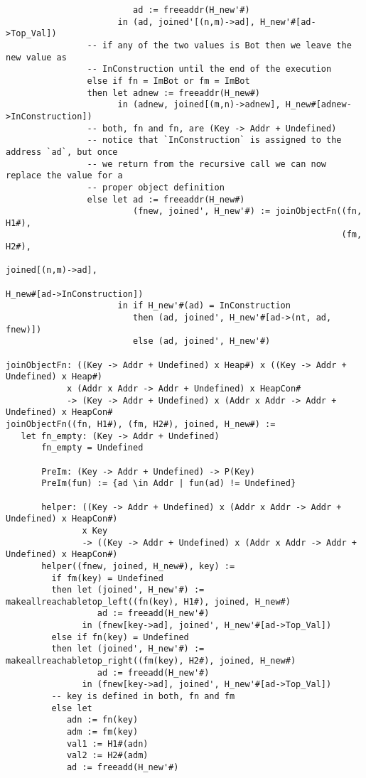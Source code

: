 \begin{verbatim}
                         ad := freeaddr(H_new'#)
                      in (ad, joined'[(n,m)->ad], H_new'#[ad->Top_Val])
                -- if any of the two values is Bot then we leave the new value as
                -- InConstruction until the end of the execution
                else if fn = ImBot or fm = ImBot
                then let adnew := freeaddr(H_new#)
                      in (adnew, joined[(m,n)->adnew], H_new#[adnew->InConstruction])
                -- both, fn and fn, are (Key -> Addr + Undefined)
                -- notice that `InConstruction` is assigned to the address `ad`, but once
                -- we return from the recursive call we can now replace the value for a
                -- proper object definition
                else let ad := freeaddr(H_new#)
                         (fnew, joined', H_new'#) := joinObjectFn((fn, H1#),
                                                                  (fm, H2#),
                                                                  joined[(n,m)->ad],
                                                                  H_new#[ad->InConstruction])
                      in if H_new'#(ad) = InConstruction
                         then (ad, joined', H_new'#[ad->(nt, ad, fnew)])
                         else (ad, joined', H_new'#)

joinObjectFn: ((Key -> Addr + Undefined) x Heap#) x ((Key -> Addr + Undefined) x Heap#)
            x (Addr x Addr -> Addr + Undefined) x HeapCon#
            -> (Key -> Addr + Undefined) x (Addr x Addr -> Addr + Undefined) x HeapCon#
joinObjectFn((fn, H1#), (fm, H2#), joined, H_new#) :=
   let fn_empty: (Key -> Addr + Undefined)
       fn_empty = Undefined

       PreIm: (Key -> Addr + Undefined) -> P(Key)
       PreIm(fun) := {ad \in Addr | fun(ad) != Undefined}

       helper: ((Key -> Addr + Undefined) x (Addr x Addr -> Addr + Undefined) x HeapCon#)
               x Key
               -> ((Key -> Addr + Undefined) x (Addr x Addr -> Addr + Undefined) x HeapCon#)
       helper((fnew, joined, H_new#), key) :=
         if fm(key) = Undefined
         then let (joined', H_new'#) := makeallreachabletop_left((fn(key), H1#), joined, H_new#)
                  ad := freeadd(H_new'#)
               in (fnew[key->ad], joined', H_new'#[ad->Top_Val])
         else if fn(key) = Undefined
         then let (joined', H_new'#) := makeallreachabletop_right((fm(key), H2#), joined, H_new#)
                  ad := freeadd(H_new'#)
               in (fnew[key->ad], joined', H_new'#[ad->Top_Val])
         -- key is defined in both, fn and fm
         else let
            adn := fn(key)
            adm := fm(key)
            val1 := H1#(adn)
            val2 := H2#(adm)
            ad := freeadd(H_new'#)


\end{verbatim}
